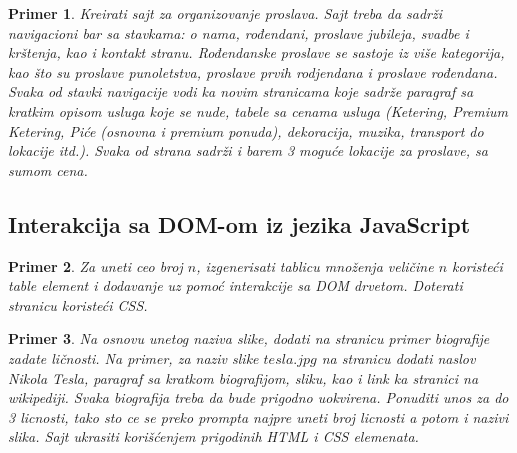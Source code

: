 \documentclass[a4paper]{article}
\newtheorem{primer}{Primer}[section]
\begin{document}
\begin{primer}
Kreirati sajt za organizovanje proslava. Sajt treba da sadrži navigacioni bar sa stavkama: o nama, rođendani, proslave jubileja, svadbe i krštenja, kao i kontakt stranu. Rođendanske proslave se sastoje iz više kategorija, kao što su proslave punoletstva, proslave prvih rodjendana i proslave rođendana. Svaka od stavki navigacije vodi ka novim stranicama koje sadrže paragraf sa kratkim opisom usluga koje se nude, tabele sa cenama usluga (Ketering, Premium Ketering, Piće (osnovna i premium ponuda), dekoracija, muzika, transport do lokacije itd.). Svaka od strana sadrži i barem 3 moguće lokacije za proslave, sa sumom cena.

\end{primer}

\subsection{Interakcija sa DOM-om iz jezika JavaScript}
\begin{primer}
Za uneti ceo broj $n$, izgenerisati tablicu množenja veličine $n$ koristeći table element i dodavanje uz pomoć interakcije sa DOM drvetom. Doterati stranicu koristeći CSS.
\end{primer}

\begin{primer}
Na osnovu unetog naziva slike, dodati na stranicu primer biografije zadate ličnosti. Na primer, za naziv slike $tesla.jpg$ na stranicu dodati naslov Nikola Tesla, paragraf sa kratkom biografijom, sliku, kao i link ka stranici na wikipediji. Svaka biografija treba da bude prigodno uokvirena. Ponuditi unos za do 3 licnosti, tako sto ce se preko prompta najpre uneti broj licnosti a potom i nazivi slika. Sajt ukrasiti korišćenjem prigodinih HTML i CSS elemenata.
\end{primer}
\end{document}
